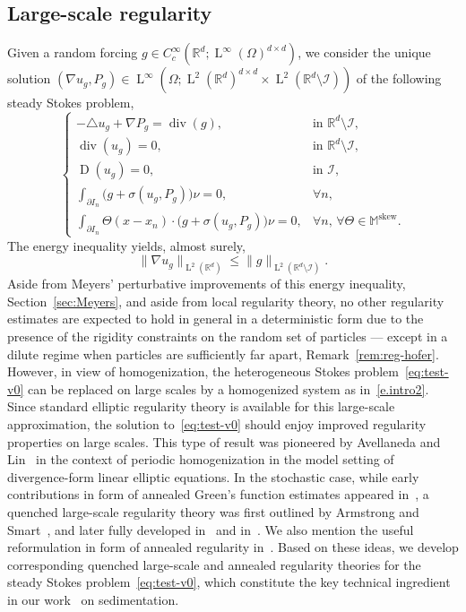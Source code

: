 \documentclass[JEP,XML,SOM,Unicode,published]{cedram}
\let\mathcal\mathscr
\theoremstyle{plain}
\theoremstyle{definition}
\newcommand{\R}{\mathbb R}
\newcommand{\Ic}{\mathcal I}
\newcommand{\Md}{\mathbb M}
\newcommand{\D}{\operatorname{D}}
\newcommand{\Ld}{\operatorname{L}}
\newcommand{\Div}{{\operatorname{div}}}
\newcommand{\Skew}{{\operatorname{skew}}}
\begin{document}
\subsection{Large-scale regularity}\label{sec:reg0}
Given a random forcing $g\in C^\infty_c(\R^d;\Ld^\infty(\Omega)^{d\times d})$, we consider the unique solution $(\nabla u_g,P_g)\in\Ld^\infty(\Omega;\Ld^2(\R^d)^{d\times d}\times\Ld^2(\R^d\setminus\Ic))$ of the following steady Stokes problem,
\begin{equation}\label{eq:test-v0}
\begin{cases}
-\triangle u_g+\nabla P_g=\Div (g),&\text{in $\R^d\setminus\Ic$},\\
\Div(u_g)=0,&\text{in $\R^d\setminus\Ic$},\\
\D(u_g)=0,&\text{in $\Ic$},\\
\int_{\partial I_{n}}\big(g+\sigma(u_g,P_g)\big)\nu=0,&\forall n,\\
\int_{\partial I_{n}}\Theta(x-x_n)\cdot\big(g+\sigma(u_g,P_g)\big)\nu=0,&\forall n,\,\forall\Theta\in\Md^\Skew.
\end{cases}
\end{equation}
The energy inequality yields, almost surely,
\begin{equation}\label{eq:energy}
\|\nabla u_g\|_{\Ld^2(\R^d)}\le\|g\|_{\Ld^2(\R^d\setminus\Ic)}.
\end{equation}
Aside from Meyers' perturbative improvements of this energy inequality, \cf Section~\ref{sec:Meyers}, and aside from local regularity theory, no other regularity estimates are expected to hold in general in a deterministic form due to the presence of the rigidity constraints on the random set of particles --- except in a dilute regime when particles are sufficiently far apart, \cf Remark~\ref{rem:reg-hofer}.
However, in view of homogenization, the heterogeneous Stokes problem~\eqref{eq:test-v0} can be replaced on large scales by a homogenized system as in~\eqref{e.intro2}.
Since standard elliptic regularity theory is available for this large-scale approximation, the solution to~\eqref{eq:test-v0} should enjoy improved regularity properties on large scales.
This type of result was pioneered by Avellaneda and Lin~\cite{Avellaneda-Lin-87,Avellaneda-Lin-91} in the context of periodic homogenization in the model setting of divergence-form linear elliptic equations.
In the stochastic case, while early contributions in form of annealed Green's function estimates appeared in~\cite{Delmotte-Deuschel-05,MaO}, a quenched large-scale regularity theory was first outlined by Armstrong and Smart~\cite{AS}, and later fully developed in~\cite{AM-16,AKM1,AKM2,AKM-book} and in~\cite{GNO-reg,GNO-quant,GO4}.
We also mention the useful reformulation in form of annealed regularity in~\cite{DO1}.
Based on these ideas, we develop corresponding quenched large-scale and annealed regularity theories for the steady Stokes problem~\eqref{eq:test-v0}, which constitute the key technical ingredient in our work~\cite{DG-20} on sedimentation.
\end{document}
